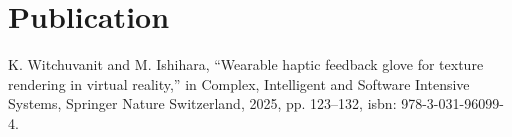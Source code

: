 \documentclass[a4paper,twocolumn]{article}
\begin{document}


\section*{Publication}
	\begin{enumerate}
		 K. Witchuvanit and M. Ishihara, “Wearable haptic feedback glove for texture rendering in virtual reality,” in Complex, Intelligent and Software Intensive Systems, Springer Nature Switzerland, 2025, pp. 123–132, isbn: 978-3-031-96099-4.
	\end{enumerate}
\end{document}
